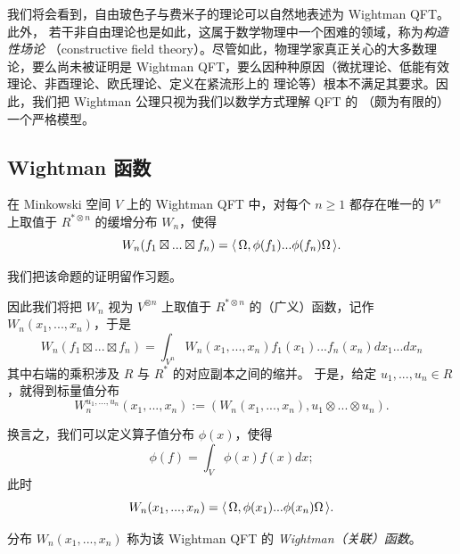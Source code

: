 
\begin{remark} 我们将会看到，自由玻色子与费米子的理论可以自然地表述为 Wightman QFT。此外，
若干非自由理论也是如此，这属于数学物理中一个困难的领域，称为\emph{构造性场论}
（constructive field theory）。尽管如此，物理学家真正关心的大多数理论，要么尚未被证明是
Wightman QFT，要么因种种原因（微扰理论、低能有效理论、非酉理论、欧氏理论、定义在紧流形上的
理论等）根本不满足其要求。因此，我们把 Wightman 公理只视为我们以数学方式理解 QFT 的
（颇为有限的）一个严格模型。
\end{remark} 

\subsection{Wightman 函数}

\begin{proposition} 
在 Minkowski 空间 $V$ 上的 Wightman QFT 中，对每个 $n\ge 1$ 都存在唯一的 $V^n$ 上取值于
$R^{*\otimes n}$ 的缓增分布 $W_n$，使得
$$
W_n(f_1\boxtimes...\boxtimes f_n)=\langle\, \Omega,\phi(f_1)...\phi(f_n)\Omega\,\rangle.
$$
\end{proposition} 

我们把该命题的证明留作习题。

因此我们将把 $W_n$ 视为 $V^{\otimes n}$ 上取值于 $R^{*\otimes n}$ 的（广义）函数，记作
$W_n(x_1,...,x_n)$，于是
$$
W_n(f_1\boxtimes...\boxtimes f_n)=\int_{V^n}W_n(x_1,...,x_n)f_1(x_1)...f_n(x_n)dx_1...dx_n
$$
其中右端的乘积涉及 $R$ 与 $R^*$ 的对应副本之间的缩并。
于是，给定 $u_1,...,u_n\in R$，就得到标量值分布
$$
W_n^{u_1,...,u_n}(x_1,...,x_n):=(W_n(x_1,...,x_n),u_1\otimes...\otimes u_n).
$$
 
换言之，我们可以定义算子值分布 $\phi(x)$，使得
$$
\phi(f)=\int_V \phi(x)f(x)dx;
$$
此时
$$
W_n(x_1,...,x_n)=\langle\, \Omega,\phi(x_1)...\phi(x_n)\Omega\,\rangle.
$$

\begin{definition} 分布 $W_n(x_1,...,x_n)$ 称为该 Wightman QFT 的
\emph{Wightman（关联）函数}。
\end{definition} 



